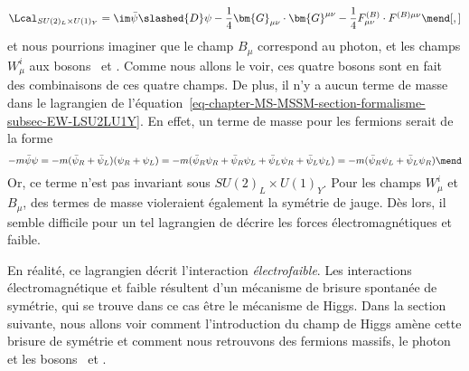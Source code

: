 \begin{equation}
\Lcal_{SU(2)_L\times U(1)_Y}
=
\im \bar{\psi} \slashed{D} \psi - \frac{1}{4} \bm{G}_{\mu\nu} \cdot \bm{G}^{\mu\nu} - \frac{1}{4} F^{(B)}_{\mu\nu} \cdot F^{(B)\mu\nu}
\mend[,]
\label{eq-chapter-MS-MSSM-section-formalisme-subsec-EW-LSU2LU1Y}
\end{equation}
et nous pourrions imaginer que le champ $B_\mu$ correspond au photon, et les champs $W^i_\mu$ aux bosons \Wbosonpm\ et \Zboson. Comme nous allons le voir, ces quatre bosons sont en fait des combinaisons de ces quatre champs.
De plus, il n'y a aucun terme de masse dans le lagrangien de l'équation~\eqref{eq-chapter-MS-MSSM-section-formalisme-subsec-EW-LSU2LU1Y}. En effet, un terme de masse pour les fermions serait de la forme
\begin{equation}
-m\bar{\psi}\psi
=
-m (\bar{\psi}_R+\bar{\psi}_L)(\psi_R+\psi_L)
=
-m (
\bar{\psi}_R \psi_R
+\bar{\psi}_R \psi_L
+\bar{\psi}_L \psi_R
+\bar{\psi}_L \psi_L
)
=
-m (\bar{\psi}_R \psi_L + \bar{\psi}_L \psi_R)
\mend
\end{equation}
Or, ce terme n'est pas invariant sous $SU(2)_L\times U(1)_Y$.
Pour les champs $W^i_\mu$ et $B_\mu$, des termes de masse violeraient également la symétrie de jauge.
Dès lors, il semble difficile pour un tel lagrangien de décrire les forces électromagnétiques et faible.
\par En réalité, ce lagrangien décrit l'interaction \emph{électrofaible}.
Les interactions électromagnétique et faible résultent d'un mécanisme de brisure spontanée de symétrie, qui se trouve dans ce cas être le mécanisme de Higgs.
Dans la section suivante, nous allons voir comment l'introduction du champ de Higgs amène cette brisure de symétrie et comment nous retrouvons des fermions massifs, le photon et les bosons \Wbosonpm\ et \Zboson.